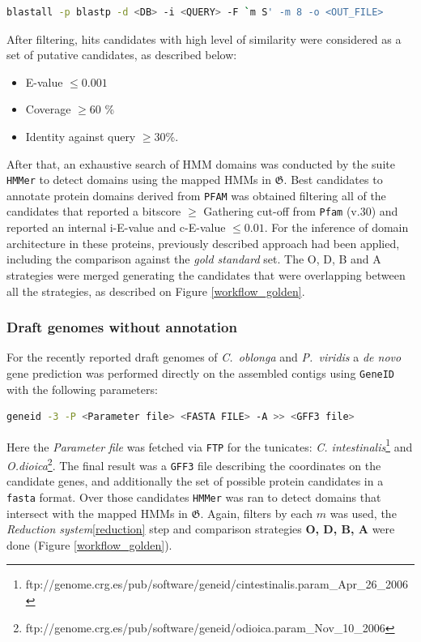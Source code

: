 \documentclass[11pt]{article}
\begin{document}
\begin{lstlisting}[language=bash, breaklines=true]
blastall -p blastp -d <DB> -i <QUERY> -F `m S' -m 8 -o <OUT_FILE>
\end{lstlisting}

After filtering, hits candidates with high level of similarity were 
considered as a set of putative candidates, as described below:

\begin{itemize}
\item E-value $\leq 0.001$
\item Coverage $\geq 60$ \%
\item Identity against query $\geq 30$\%.
\end{itemize}

After that, an exhaustive search of HMM domains was conducted by the suite 
\texttt{HMMer} to detect domains using the mapped HMMs in 
$\boldsymbol{\mathfrak{G}}$. Best candidates to annotate protein domains 
derived from \texttt{PFAM} was obtained filtering all of the candidates that 
reported a bitscore $\geq$ Gathering cut-off from \texttt{Pfam} (v.30) and 
reported an internal i-E-value and c-E-value $\leq 0.01$. For the inference of 
domain architecture in these proteins, previously described approach had been 
applied, including the comparison against the \textsl{gold standard} set. The O, 
D, B and A strategies were merged generating the candidates that were 
overlapping between all the strategies, as described on Figure 
\ref{workflow_golden}.

\subsubsection*{Draft genomes without annotation}

For the recently reported draft genomes of \textit{C.\ oblonga} and 
\textit{P.\ viridis} a \textit{de novo} gene prediction was performed 
directly on the assembled contigs using \texttt{GeneID}\cite{Blanco:2007} 
with the following parameters:

\begin{lstlisting}[language=bash, breaklines=true]
geneid -3 -P <Parameter file> <FASTA FILE> -A >> <GFF3 file>
\end{lstlisting}

Here the \textit{Parameter file} was fetched via \texttt{FTP} for the 
tunicates: \textsl{C. intestinalis}\footnote{
ftp://genome.crg.es/pub/software/geneid/cintestinalis.param\_Apr\_26\_2006} and 
\textsl{O.dioica}\footnote{
ftp://genome.crg.es/pub/software/geneid/odioica.param\_Nov\_10\_2006}. The final 
result was a \texttt{GFF3} file describing the coordinates on the candidate 
genes, and additionally the set of possible protein candidates in a 
\texttt{fasta} format. Over those candidates \texttt{HMMer} was ran to detect 
domains that intersect with the mapped HMMs in $\boldsymbol{\mathfrak{G}}$. 
Again, filters by each $m$ was used, the \textsl{Reduction 
system}\ref{reduction} step and comparison strategies \textbf{O, D, B, A} were 
done (Figure \ref{workflow_golden}).
\end{document}
